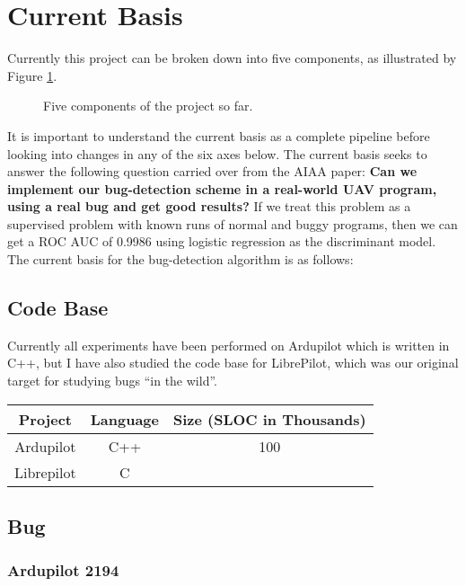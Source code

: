 \section{Current Basis}

Currently this project can be broken down into five components, as
illustrated by Figure \ref{fig:projcomp}.

\begin{figure}[h]
  \caption{Five components of the project so far. }
  \label{fig:projcomp}
\end{figure}

It is important to understand the current basis as a complete pipeline
before looking into changes in any of the six axes below. The current
basis seeks to answer the following question carried over from the
AIAA paper: \textbf{Can we implement our bug-detection scheme in a
  real-world UAV program, using a real bug and get good results?} If
we treat this problem as a supervised problem with known runs of
normal and buggy programs, then we can get a ROC AUC of 0.9986 using
logistic regression as the discriminant model. The current
basis for the bug-detection algorithm is as follows:

\subsection{Code Base}

Currently all experiments have been performed on Ardupilot which is
written in C++, but I have also studied the code base for LibrePilot,
which was our original target for studying bugs ``in the wild''. 

\begin{table*} [h]
  \begin{tabular} {c | c c}
    Project & Language & Size (SLOC in Thousands) \\
    \hline
    Ardupilot & C++ & 100 \\
    Librepilot & C & \\
  \end{tabular}
\end{table*}

\subsection{Bug}

\subsubsection{Ardupilot 2194}

